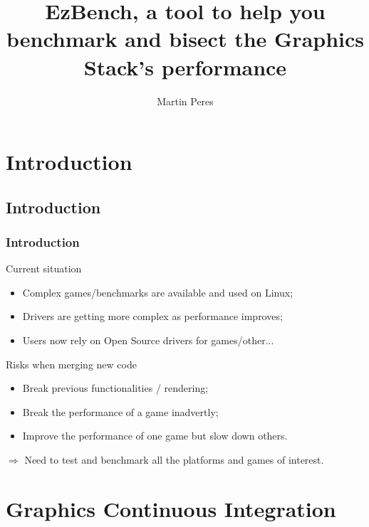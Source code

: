 \documentclass[11pt,english,compress]{beamer}
\title{EzBench, a tool to help you benchmark and bisect the Graphics Stack's performance}
\subtitle{}
\author{Martin Peres}
\institute{Intel Open Source Technology Center Finland}
\begin{document}

\begin{frame}
	\titlepage
\end{frame}

\section{Introduction}
\subsection*{Introduction}
\begin{frame}
	\frametitle{Introduction}

	\begin{block}{Current situation}
		\begin{itemize}
			\item Complex games/benchmarks are available and used on Linux;
			\item Drivers are getting more complex as performance improves;
			\item Users now rely on Open Source drivers for games/other...
		\end{itemize}
	\end{block}
	
	\pause
	
	\begin{block}{Risks when merging new code}
		\begin{itemize}
			\item Break previous functionalities / rendering;
			\item Break the performance of a game inadvertly;
			\item Improve the performance of one game but slow down others.
		\end{itemize}
	\end{block}
	
	\pause
	
	\begin{block}{}
		$\Rightarrow$ Need to test and benchmark all the platforms and games of interest.
	\end{block}
\end{frame}

\section{Graphics Continuous Integration}
\end{document}
